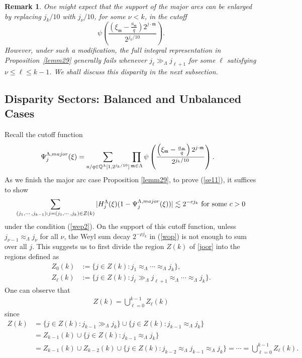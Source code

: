 \documentclass[10pt,a4paper]{amsart}
\newtheorem{remark}{Remark}\numberwithin{remark}{section}
\numberwithin{equation}{section}
\begin{document}
\begin{remark}
	One might expect that the support of the major arcs can be enlarged by replacing 
	$j_k/10$ with $j_\nu/10$, for some  $\nu<k$, in the cutoff
	\[
	\psi\!\left(
	\frac{\left(\xi_{\mathfrak{m}} - \frac{a_{\mathfrak{m}}}{q}\right)
		2^{j\cdot \mathfrak{m}}}{2^{j_k/10}}
	\right).
	\]
	However, under such a modification, the full integral representation in Proposition~\ref{lemm29} generally fails whenever
	$
	j_{\ell} \gg_{\Lambda} j_{\ell+1}  
	$ for some $\ell$ satisfying  $\nu\le \ell\le k-1$. We shall discuss this disparity in the next subsection.	
\end{remark}

 \subsection{Disparity Sectors: Balanced and Unbalanced Cases}\label{sec30}
Recall the cutoff function
\begin{align} \label{100s}
	\Psi^{\Lambda,\rm{major}}_{j}(\xi)&=\sum_{a/q\in \mathbb{Q}^{\Lambda}[1,2^{j_k/10}]} 
	\prod_{\mathfrak{m}\in\Lambda} \psi\left( 
	\frac{ \left(\xi_{\mathfrak{m}}-\frac{a_{\mathfrak{m}} }{q}\right)      2^{j\cdot \mathfrak{m}}    }{  2^{j_k/10}  }   \right).
\end{align} 
As   we finish the  major arc case  Proposition \ref{lemm29},
to prove  (\ref{se11}), it suffices to show 
\begin{align}\label{rr18}
	\sum_{(j_1,\cdots,j_{k-1}):j=(j_1,\cdots,j_k)\in Z(k)}|H^{\Lambda}_j(\xi)(1-\Psi^{\Lambda,\rm{major}}_{j}(\xi))|\lesssim 2^{-cj_k}\ \text{for some $c>0$}
\end{align} 
under the  condition (\ref{wep2}). 
On the support of this cutoff function, unless $j_{\nu-1}\approx_{\Lambda} j_\nu$ for all $\nu$,  the Weyl sum decay $2^{-\rho j_k}$   in (\ref{wop})  is not enough to sum over all $j$.
This   suggests us to first divide the region $Z(k)$ of \eqref{joor} 
 into the regions
defined as
\begin{align*}
Z_0(k)&:=\{ j\in Z(k):   j_{1}\approx_{\Lambda}  \cdots\approx_{\Lambda} j_k\}, \\
	Z_{\ell}(k)&:=\{j\in Z(k):   j_\ell\gg_{\Lambda} j_{\ell+1}\approx_{\Lambda}\cdots\approx_{\Lambda} j_k\}. 
\end{align*}
One can observe that
\begin{align*}
	Z(k)=\bigcup_{\ell=0}^{k-1}Z_{\ell}(k) 
\end{align*}
since   
\begin{align*}
	Z(k)&=  \{j\in Z(k): j_{k-1}\gg_{\Lambda} j_k\} \cup \{j\in Z(k): j_{k-1}\approx_{\Lambda} j_k\}\\
	&=Z_{k-1}(k)\cup  \{j\in Z(k): j_{k-1}\approx_{\Lambda} j_k\}\\
	&= Z_{k-1}(k)\cup Z_{k-2}(k)\cup  \{j\in Z(k): j_{k-2}\approx_{\Lambda} j_{k-1}\approx_{\Lambda} j_k\}=\cdots=\bigcup_{\ell=0}^{k-1}Z_{\ell}(k).
\end{align*}
\end{document}
